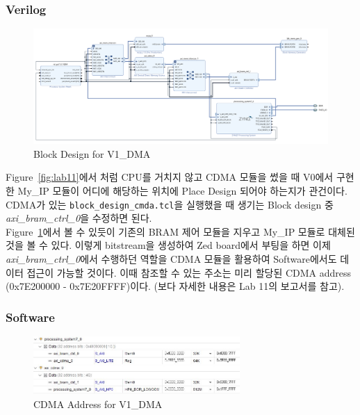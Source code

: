 \documentclass{article}
\begin{document}
\subsubsection{Verilog}

\begin{figure}[htb!]
	\centering
	\includegraphics[width=1.0\textwidth]{fig/V1_DMA/design.png}
\caption{Block Design for V1\_DMA}
\label{design_v1_dma}
\end{figure}

Figure~\ref{fig:lab11}에서 처럼 CPU를 거치지 않고 CDMA 모듈을 썼을 때 V0에서 구현한 My\_IP 모듈이 어디에 해당하는 위치에 Place Design 되어야 하는지가 관건이다. CDMA가 있는 \texttt{block\_design\_cmda.tcl}을 실행했을 때 생기는 Block design 중 \textit{axi\_bram\_ctrl\_0}을 수정하면 된다.\\

Figure~\ref{design_v1_dma}에서 볼 수 있듯이 기존의 BRAM 제어 모듈을 지우고 My\_IP 모듈로 대체된 것을 볼 수 있다. 이렇게 bitstream을 생성하여 Zed board에서 부팅을 하면 이제 \textit{axi\_bram\_ctrl\_0}에서 수행하던 역할을 CDMA 모듈을 활용하여 Software에서도 데이터 접근이 가능할 것이다. 이때 참조할 수 있는 주소는 미리 할당된 CDMA address (0x7E200000 - 0x7E20FFFF)이다. (보다 자세한 내용은 Lab 11의 보고서를 참고).

\subsubsection{Software}

\begin{figure}[htb!]
	\centering
	\includegraphics[width=0.7\textwidth]{fig/V1_DMA/address.jpg}
\caption{CDMA Address for V1\_DMA}
\label{address_v1_dma}
\end{figure}
\end{document}

